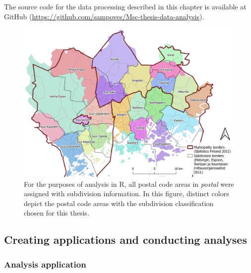 The source code for the data processing described in this chapter is available at GitHub (\textcolor{blue}{\url{https://github.com/sampoves/Msc-thesis-data-analysis}}).

\begin{figure}[H]%
    \includegraphics[width=\textwidth]{images/thesis_subdiv_place.png}
    \caption[Placing postal code areas in subdivisions]{For the purposes of analysis in R, all postal code areas in \textit{postal} were assigned with subdivision information. In this figure, distinct colors depict the postal code areas with the subdivision classification chosen for this thesis.}%
    \label{fig:subdiv_placement}%
\end{figure}

\subsection{Creating applications and conducting analyses}
\subsubsection{Analysis application}
\justify

